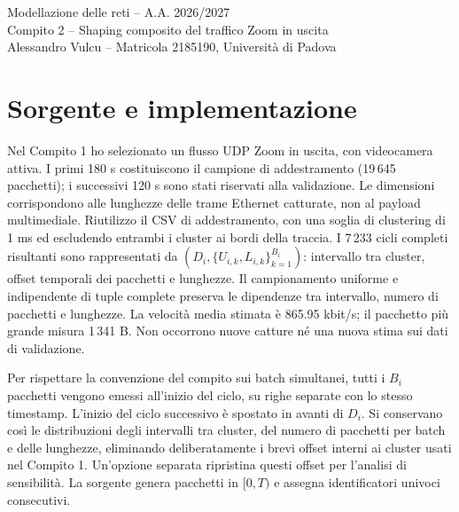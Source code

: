 \documentclass[10pt,a4paper]{article}
\begin{document}
\begin{center}
{\Large Modellazione delle reti -- A.A. 2026/2027}\\[4pt]
{\large Compito 2 -- Shaping composito del traffico Zoom in uscita}\\[5pt]
Alessandro Vulcu -- Matricola 2185190, Università di Padova
\end{center}
\begin{abstract}
Implemento un token bucket seguito da un leaky bucket a velocità costante, entrambi
in tempo simulato, usando la sorgente empirica Zoom stimata nel Compito 1. Una ricerca
su griglia seleziona velocità e capacità dei buffer nel rispetto di vincoli su perdita
e ritardo. Repliche indipendenti di 30 minuti confermano la configurazione scelta.
I risultati quantificano il contributo dello shaper alla QoS per il modello di traffico
stimato, anziché la qualità complessiva della chiamata.
\end{abstract}
\section{Sorgente e implementazione}
Nel Compito 1 ho selezionato un flusso UDP Zoom in uscita, con videocamera attiva.
I primi 180 s costituiscono il campione di addestramento (19\,645 pacchetti); i successivi
120 s sono stati riservati alla validazione. Le dimensioni corrispondono alle lunghezze
delle trame Ethernet catturate, non al payload multimediale. Riutilizzo il CSV di
addestramento, con una soglia di clustering di 1 ms ed escludendo entrambi i cluster
ai bordi della traccia. I 7\,233 cicli completi risultanti sono rappresentati da
$(D_i,\{U_{i,k},L_{i,k}\}_{k=1}^{B_i})$: intervallo tra cluster, offset temporali
dei pacchetti e lunghezze. Il campionamento uniforme e indipendente di tuple complete
preserva le dipendenze tra intervallo, numero di pacchetti e lunghezze. La velocità
media stimata è 865.95 kbit/s; il pacchetto più grande misura 1\,341 B. Non occorrono
nuove catture né una nuova stima sui dati di validazione.

Per rispettare la convenzione del compito sui batch simultanei, tutti i $B_i$ pacchetti
vengono emessi all'inizio del ciclo, su righe separate con lo stesso timestamp.
L'inizio del ciclo successivo è spostato in avanti di $D_i$. Si conservano così le
distribuzioni degli intervalli tra cluster, del numero di pacchetti per batch e delle
lunghezze, eliminando deliberatamente i brevi offset interni ai cluster usati nel
Compito 1. Un'opzione separata ripristina questi offset per l'analisi di sensibilità.
La sorgente genera pacchetti in $[0,T)$ e assegna identificatori univoci consecutivi.
\end{document}
